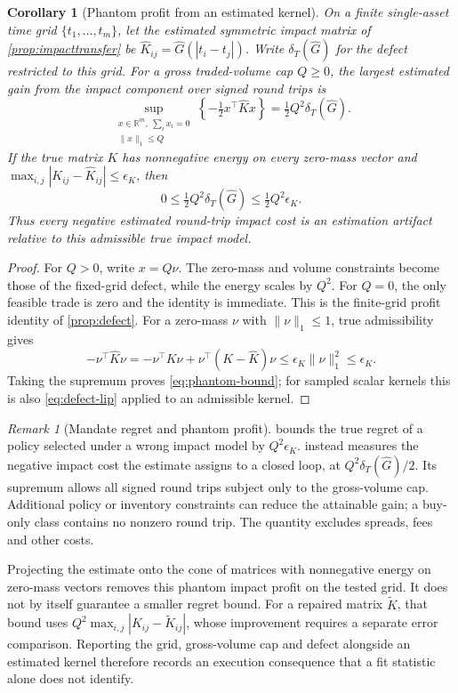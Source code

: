 \documentclass[11pt]{article}
\numberwithin{equation}{section}
\newtheorem{corollary}[theorem]{Corollary}
\theoremstyle{definition}
\theoremstyle{remark}
\newtheorem{remark}[theorem]{Remark}
\newcommand{\R}{\mathbb{R}}
\theoremstyle{definition}
\begin{document}
\begin{corollary}[Phantom profit from an estimated kernel]\label{cor:phantom}
On a finite single-asset time grid $\{t_1,\ldots,t_m\}$, let the estimated
symmetric impact matrix of \cref{prop:impacttransfer} be
$\widehat K_{ij}=\widehat G(|t_i-t_j|)$. Write $\delta_T(\widehat G)$ for
the defect restricted to this grid. For a gross traded-volume cap $Q\geq0$,
the largest estimated gain from the impact component over signed round trips is
\begin{equation}\label{eq:phantom-profit}
 \sup_{\substack{x\in\R^m,\ \sum_i x_i=0\\\|x\|_1\leq Q}}
       \left\{-\tfrac12x^\top\widehat Kx\right\}
       =\tfrac12Q^2\delta_T(\widehat G).
\end{equation}
If the true matrix $K$ has nonnegative energy on every zero-mass vector
and $\max_{i,j}|K_{ij}-\widehat K_{ij}|\leq\epsilon_K$, then
\begin{equation}\label{eq:phantom-bound}
 0\leq\tfrac12Q^2\delta_T(\widehat G)\leq\tfrac12Q^2\epsilon_K.
\end{equation}
Thus every negative estimated round-trip impact cost is an estimation
artifact relative to this admissible true impact model.
\end{corollary}
\begin{proof}
For $Q>0$, write $x=Q\nu$. The zero-mass and volume constraints become
those of the fixed-grid defect, while the energy scales by $Q^2$.
For $Q=0$, the only feasible trade is zero and the identity is immediate.
This is the finite-grid profit identity of \cref{prop:defect}.
For a zero-mass $\nu$ with $\|\nu\|_1\leq1$, true admissibility gives
\[
 -\nu^\top\widehat K\nu
 =-\nu^\top K\nu+\nu^\top(K-\widehat K)\nu
 \leq\epsilon_K\|\nu\|_1^2\leq\epsilon_K.
\]
Taking the supremum proves \eqref{eq:phantom-bound}; for sampled scalar
kernels this is also \eqref{eq:defect-lip} applied to an admissible kernel.
\end{proof}

\begin{remark}[Mandate regret and phantom profit]\label{rem:two-consequences}
 bounds the true regret of a policy selected under
a wrong impact model by $Q^2\epsilon_K$.  instead
measures the negative impact cost the estimate assigns to a closed loop,
at $Q^2\delta_T(\widehat G)/2$. Its supremum allows all signed round trips
subject only to the gross-volume cap. Additional policy or inventory
constraints can reduce the attainable gain; a buy-only class contains no
nonzero round trip. The quantity excludes spreads, fees and other costs.

Projecting the estimate onto the cone of matrices with nonnegative energy
on zero-mass vectors removes this phantom impact profit on the tested grid.
It does not by itself guarantee a smaller regret bound. For a repaired
matrix $\widetilde K$, that bound uses
$Q^2\max_{i,j}|K_{ij}-\widetilde K_{ij}|$, whose improvement requires a
separate error comparison. Reporting the grid, gross-volume cap and defect
alongside an estimated kernel therefore records an execution consequence
that a fit statistic alone does not identify.
\end{remark}
\end{document}
